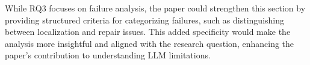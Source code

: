 \documentclass[12pt,american]{article}
\begin{document}
\begin{revresponse}



\end{revresponse}



\begin{revcomment}\label{reviewer:1.4}
While RQ3 focuses on failure analysis, the paper could strengthen this section by providing structured criteria for categorizing failures, such as distinguishing between localization and repair issues. This added specificity would make the analysis more insightful and aligned with the research question, enhancing the paper’s contribution to understanding LLM limitations.





\end{revcomment}
\end{document}
